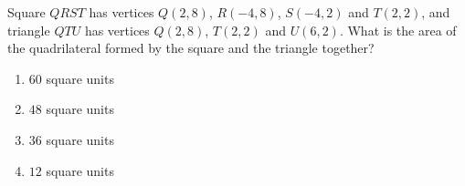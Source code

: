 Square $QRST$ has vertices $Q(2,8)$, $R(-4,8)$, $S(-4,2)$ and $T(2,2)$, and triangle $QTU$ has vertices $Q(2,8)$, $T(2,2)$ and $U(6,2)$. What is the area of the quadrilateral formed by the square and the triangle together?
\begin{enumerate}
\item[(A)] $60$ square units
\item[(B)] $48$ square units
\item[(C)] $36$ square units
\item[(D)] $12$ square units
\end{enumerate}

